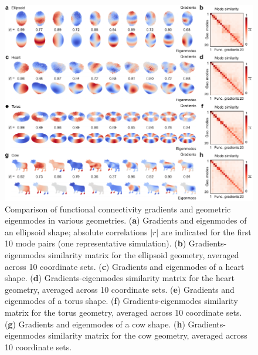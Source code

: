 \documentclass{article}
\begin{document}
\renewcommand{\thefigure}{S\arabic{figure}}
\addtocounter{figure}{-7}

\begin{figure}[h]
    \centering
    \includegraphics[width=1.0\linewidth]{figures/supp_geometries.pdf}
    \caption{Comparison of functional connectivity gradients and geometric eigenmodes in various geometries. (\textbf{a}) Gradients and eigenmodes of an ellipsoid shape; absolute correlations $|r|$ are indicated for the first 10 mode pairs (one representative simulation). (\textbf{b}) Gradients-eigenmodes similarity matrix for the ellipsoid geometry, averaged across 10 coordinate sets. (\textbf{c}) Gradients and eigenmodes of a heart shape. (\textbf{d}) Gradients-eigenmodes similarity matrix for the heart geometry, averaged across 10 coordinate sets. (\textbf{e}) Gradients and eigenmodes of a torus shape. (\textbf{f}) Gradients-eigenmodes similarity matrix for the torus geometry, averaged across 10 coordinate sets. (\textbf{g}) Gradients and eigenmodes of a cow shape. (\textbf{h}) Gradients-eigenmodes similarity matrix for the cow geometry, averaged across 10 coordinate sets.}
    \label{supp_geometries}
\end{figure}

\newpage
\end{document}
